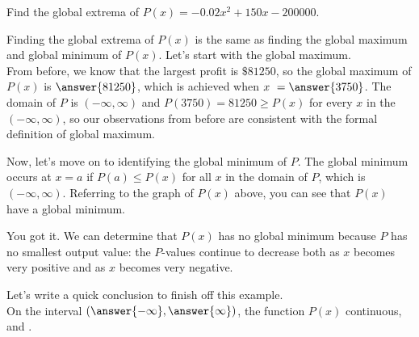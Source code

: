 \documentclass{ximera}
\begin{document}
\begin{example}
Find the global extrema of $P(x) = -0.02x^2 + 150x-200000$.
\begin{explanation}
Finding the global extrema of $P(x)$ is the same as finding the global maximum and global minimum of $P(x)$.  Let's start with the global maximum.  \\

From before, we know that the largest profit is $\$81250$, so the global maximum of $P(x)$ is $\answer{81250}$, which is achieved when $x \ = \answer{3750}$.  The domain of $P$ is $(-\infty, \infty)$ and $P(3750) = 81250 \geq P(x)$ for every $x$ in the $(-\infty, \infty)$, so our observations from before are consistent with the formal definition of global maximum. \\

\begin{explanation}

Now, let's move on to identifying the global minimum of $P$.  The global minimum occurs at $x=a$ if $P(a) \leq P(x)$ for all $x$ in the domain of $P$, which is $(-\infty, \infty)$.  Referring to the graph of $P(x)$ above, you can see that $P(x)$  have a global minimum. 

\begin{feedback}[correct]
You got it.  We can determine that $P(x)$ has no global minimum because $P$ has no smallest output value: the $P$-values continue to decrease both as $x$ becomes very positive and as $x$ becomes very negative. 
\end{feedback}

\begin{explanation}

Let's write a quick conclusion to finish off this example. \\

On the  interval $\left( \answer{-\infty}, \answer{\infty} \right)$, the function $P(x)$  continuous, and .


\end{explanation}

\end{explanation}

\end{explanation}

\end{example}
\end{document}

